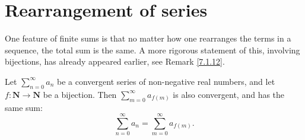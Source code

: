 \section{Rearrangement of series}\label{sec 7.4}

\begin{note}
One feature of finite sums is that no matter how one rearranges the terms in a sequence, the total sum is the same.
A more rigorous statement of this, involving bijections, has already appeared earlier, see Remark \ref{7.1.12}.
\end{note}

\begin{proposition}\label{7.4.1}
Let \(\sum_{n = 0}^\infty a_n\) be a convergent series of non-negative real numbers, and let \(f : \mathbf{N} \to \mathbf{N}\) be a bijection.
Then \(\sum_{m = 0}^\infty a_{f(m)}\) is also convergent, and has the same sum:
\[
    \sum_{n = 0}^\infty a_n = \sum_{m = 0}^\infty a_{f(m)}.
\]
\end{proposition}

